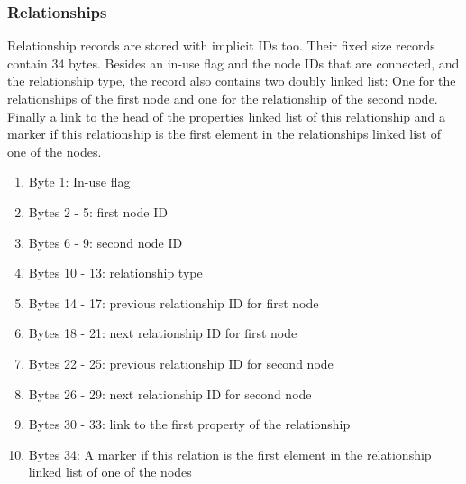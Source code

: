 \documentclass[a4paper,10pt]{article}
\begin{document}
    \subsubsection{Relationships}
    Relationship records are stored with implicit IDs too. Their fixed size records contain 34 bytes. Besides an in-use flag and the node IDs that are connected, and the relationship type, the record also contains two doubly linked list: One for the relationships of the first node and one for the relationship of the second node. Finally a link to the head of the properties linked list of this relationship and a marker if this relationship is the first element in the relationships linked list of one of the nodes.
    \begin{enumerate}
     \item Byte 1: In-use flag 
     \item Bytes 2 - 5: first node ID 
     \item Bytes 6 - 9: second node ID 
     \item Bytes 10 - 13: relationship type 
     \item Bytes 14 - 17: previous relationship ID for first node
     \item Bytes 18 - 21: next relationship ID for first node
     \item Bytes 22 - 25: previous relationship ID for second node
     \item Bytes 26 - 29: next relationship ID for second node
     \item Bytes 30 - 33: link to the first property of the relationship
     \item Bytes 34: A marker if this relation is the first element in the relationship linked list of one of the nodes
    \end{enumerate}
\end{document}
